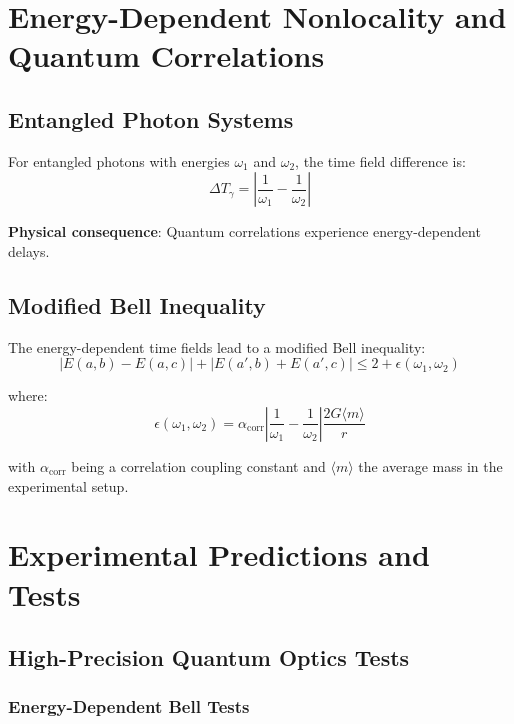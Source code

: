 \documentclass[12pt,a4paper]{article}
\begin{document}
	\section{Energy-Dependent Nonlocality and Quantum Correlations}
	
	\subsection{Entangled Photon Systems}
	
	For entangled photons with energies $\omega_1$ and $\omega_2$, the time field difference is:
	\begin{equation}
		\Delta T_\gamma = \left|\frac{1}{\omega_1} - \frac{1}{\omega_2}\right|
		\label{eq:time_field_difference}
	\end{equation}
	
	\textbf{Physical consequence}: Quantum correlations experience energy-dependent delays.
	
	\subsection{Modified Bell Inequality}
	
	The energy-dependent time fields lead to a modified Bell inequality:
	\begin{equation}
		|E(a,b) - E(a,c)| + |E(a',b) + E(a',c)| \leq 2 + \epsilon(\omega_1, \omega_2)
		\label{eq:modified_bell_inequality}
	\end{equation}
	
	where:
	\begin{equation}
		\epsilon(\omega_1, \omega_2) = \alpha_{\text{corr}} \left|\frac{1}{\omega_1} - \frac{1}{\omega_2}\right| \frac{2G\langle m \rangle}{r}
		\label{eq:bell_correction}
	\end{equation}
	
	with $\alpha_{\text{corr}}$ being a correlation coupling constant and $\langle m \rangle$ the average mass in the experimental setup.
	

	\section{Experimental Predictions and Tests}
	
	\subsection{High-Precision Quantum Optics Tests}
	
	\subsubsection{Energy-Dependent Bell Tests}
	
\end{document}
